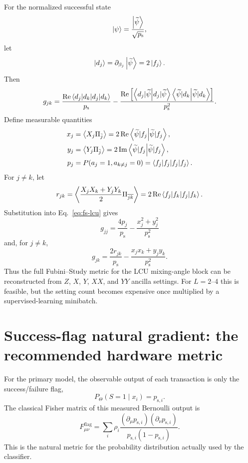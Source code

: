 \documentclass[11pt,a4paper]{article}
\newcommand{\psucc}{p_{\mathrm{s}}}
\newcommand{\kettildepsi}{\ket{\widetilde\psi}}
\newcommand{\expect}[1]{\left\langle #1 \right\rangle}
\begin{document}
For the normalized successful state
\begin{equation}
    \ket{\psi}=\frac{\kettildepsi}{\sqrt{\psucc}},
\end{equation}
let
\begin{equation}
    \ket{d_j}=\partial_{\beta_j}\kettildepsi=2\ket{f_j}.
\end{equation}
Then
\begin{equation}
 g_{jk}
 =\frac{\operatorname{Re}\braket{d_j|d_k}}{\psucc}
 -\frac{\operatorname{Re}\left[
 \braket{d_j|\widetilde\psi}
 \braket{\widetilde\psi|d_k}
 \right]}{\psucc^2}.
\label{eq:fs-lcu}
\end{equation}
Define measurable quantities
\begin{align}
 x_j&=\expect{X_j\Pi_{\bar j}}
 =2\operatorname{Re}\braket{\widetilde\psi|f_j},\\
 y_j&=\expect{Y_j\Pi_{\bar j}}
 =2\operatorname{Im}\braket{\widetilde\psi|f_j},\\
 p_j&=P(a_j=1,a_{k\neq j}=0)
 =\braket{f_j|f_j}.
\end{align}
For $j\neq k$, let
\begin{equation}
 r_{jk}
 =\expect{
 \frac{X_jX_k+Y_jY_k}{2}\Pi_{\overline{jk}}
 }
 =2\operatorname{Re}\braket{f_j|f_k}.
\end{equation}
Substitution into Eq.~\eqref{eq:fs-lcu} gives
\begin{equation}
\boxed{
 g_{jj}=\frac{4p_j}{\psucc}
 -\frac{x_j^2+y_j^2}{\psucc^2}
}
\end{equation}
and, for $j\neq k$,
\begin{equation}
\boxed{
 g_{jk}=\frac{2r_{jk}}{\psucc}
 -\frac{x_jx_k+y_jy_k}{\psucc^2}.
}
\end{equation}
Thus the full Fubini--Study metric for the LCU mixing-angle block can be reconstructed from $Z$, $X$, $Y$, $XX$, and $YY$ ancilla settings. For $L=2$--4 this is feasible, but the setting count becomes expensive once multiplied by a supervised-learning minibatch.

\section{Success-flag natural gradient: the recommended hardware metric}

For the primary model, the observable output of each transaction is only the success/failure flag,
\begin{equation}
    P_\Theta(S=1\mid x_i)=p_{\mathrm{s},i}.
\end{equation}
The classical Fisher matrix of this measured Bernoulli output is
\begin{equation}
\boxed{
 F_{\mu\nu}^{\mathrm{flag}}
 =\sum_i\rho_i
 \frac{
 (\partial_\mu p_{\mathrm{s},i})(\partial_\nu p_{\mathrm{s},i})
 }{
 p_{\mathrm{s},i}(1-p_{\mathrm{s},i})
 }.
}
\label{eq:flag-fisher}
\end{equation}
This is the natural metric for the probability distribution actually used by the classifier.
\end{document}
